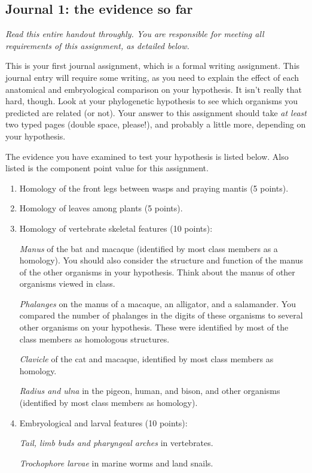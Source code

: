 \documentclass[12pt]{exam}
\begin{document}
\subsection*{Journal 1: the evidence so far}

\emph{Read this entire handout throughly. You are responsible for meeting all requirements of this assignment, as detailed below.}

This is your first journal assignment, which is a formal writing assignment. 
This journal entry will require
some writing, as you need to explain the effect of each anatomical and
embryological comparison on your hypothesis. It isn't really that hard,
though. Look at your phylogenetic hypothesis to see which organisms you
predicted are related (or not). Your answer to this assignment should
take \emph{at least} two typed pages (double space, please!), and
probably a little more, depending on your hypothesis.

The evidence you have examined to test your hypothesis is listed below. Also listed is the component point value for this assignment.

\begin{enumerate}

	\item Homology of the front legs between wasps and praying mantis (5 points).
	
	\item Homology of leaves among plants (5 points).

	\item Homology of vertebrate skeletal features (10 points):

	\emph{Manus} of the bat and macaque (identified by most
class members as a homology). You should also consider the structure and
function of the manus of the other organisms in your hypothesis. Think
about the manus of other organisms viewed in class.

	\emph{Phalanges} on the manus of a macaque, an
alligator, and a salamander. You compared the number of phalanges in the digits of these organisms
to several other organisms on your hypothesis. These were identified by
most of the class members as homologous structures.

	\emph{Clavicle} of the cat and macaque, identified by most class members
as homology.

\emph{Radius and ulna} in the pigeon, human,
and bison, and other organisms (identified by most class members as homology).

	\item Embryological and larval features (10 points):
	
\emph{Tail, limb buds and pharyngeal arches} in vertebrates.

\emph{Trochophore larvae} in marine worms and land snails.

\end{enumerate}
\end{document}
